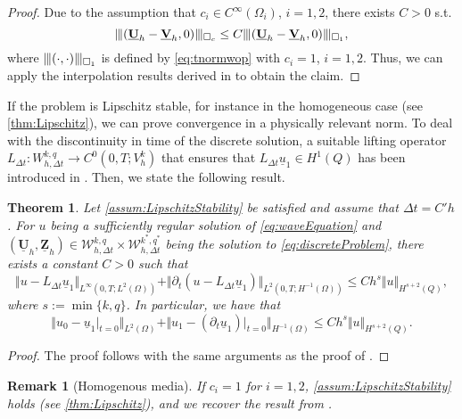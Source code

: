 \documentclass[sn-mathphys-num]{sn-jnl}
\newtheorem{thm}{Theorem}[section]
\newtheorem{rmk}{Remark}
\numberwithin{equation}{section}
\newcommand{\wop}{\square_c}
\newcommand{\tnorm}[1]{\vert\hspace{-0.3mm}\Vert#1\Vert\hspace{-0.3mm}\vert}
\newcommand{\FullyDiscrSpace}[2]{ W^{ {#1},{#2}}_{h, \Delta t  } }
\newcommand{\ProdFullyDiscrSpace}[2]{ \mathcal{W}^{ {#1},{#2}}_{h, \Delta t  } }
\newcommand{\Uh}{\underline{\mathbf{U}}_h}
\newcommand{\Vh}{\underline{\mathbf{V}}_h}
\newcommand{\Zh}{\underline{\mathbf{Z}}_h}
\newcommand{\ul}{\underline{u}}
\newcommand{\dt}{\partial_t}
\begin{document}
\begin{proof}
    Due to the assumption that $c_i \in C^\infty(\Omega_i)$, $i = 1,2$, there exists $C > 0$ s.t.  
    \begin{equation*}
        \tnorm{(\Uh - \Vh, 0)}_{\wop} \le C \tnorm{(\Uh - \Vh, 0)}_{\square_1},
    \end{equation*}
where $\tnorm{(\cdot, \cdot)}_{\square_1}$ is defined by \eqref{eq:tnormwop} with $c_i = 1$, $i = 1,2$. Thus, we can apply the interpolation results derived in \cite[Lemma 5 \& 11]{BP24} to obtain the claim. 
\end{proof}


If the problem is Lipschitz stable, for instance in the homogeneous case (see \cref{thm:Lipschitz}), we can prove convergence in a physically relevant norm. To deal with the discontinuity in time of the discrete solution, a suitable lifting operator $L_{\Delta t} : \FullyDiscrSpace{k}{q} \rightarrow C^0(0,T;V_h^k)$ that ensures that $L_{\Delta t} \ul_1 \in H^1(Q)$ has been introduced in \cite[Sec. 4]{BP24}. Then, we state the following result.

\begin{thm}\label{thm:convergence}
    Let \cref{assum:LipschitzStability} be satisfied and assume that $\Delta t = C' h$. For $u$ being a sufficiently regular solution of \eqref{eq:waveEquation} and $(\Uh,\Zh) \in \ProdFullyDiscrSpace{k}{q} \times \ProdFullyDiscrSpace{k^\ast}{q^\ast}$ being the solution to \eqref{eq:discreteProblem}, there exists a constant $C>0$ such that
    \begin{equation}
	    \Vert u - L_{\Delta t} \ul_1 \Vert_{L^\infty(0,T;L^2(\Omega))} + \Vert \dt (u - L_{\Delta t} \ul_1) \Vert_{L^2(0,T;H^{-1}(\Omega))} \le C h^s \Vert u \Vert_{H^{s+2}(Q)}, 
    \end{equation}
    where $s := \min\{ k,q \}$. In particular, we have that 
    \begin{equation}
	    \Vert u_0 - \ul_1 \vert_{t = 0} \Vert_{L^2(\Omega)} + \Vert u_1 - (\dt \ul_1) \vert_{t = 0} \Vert_{H^{-1}(\Omega)} \le C h^s \Vert u \Vert_{H^{s+2}(Q)}.
    \end{equation}
\end{thm}

\begin{proof}
    The proof follows with the same arguments as the proof of \cite[Theorem 14]{BP24}.
\end{proof}


\begin{rmk}[Homogenous media]\label{rem:homMedia}
    If $c_i = 1$ for $i = 1,2$, \cref{assum:LipschitzStability} holds (see \cref{thm:Lipschitz}), and we recover the result from \cite[Theorem 14]{BP24}.
\end{rmk}
\end{document}
